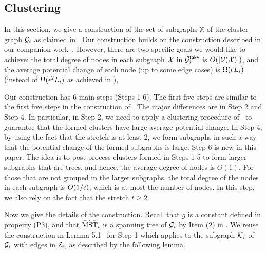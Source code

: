 \subsection{Clustering} \label{subsec:clusteringT2}


In this section, we give a construction of the set of subgraphs $\mathbb{X}$ of the cluster graph $\mathcal{G}_i$ as claimed in . Our construction builds on the construction described in our companion work~\cite{LS21}. However, there are two specific goals we would like to achieve: the total degree of nodes in each subgraph $\mathcal{X}$ in $\mathcal{G}_i^{\mathsf{take}}$  is $O(|\mathcal{V}(\mathcal{X})|)$, and the average potential change of each node (up to some edge cases) is $\Omega(\epsilon L_i)$ (instead of $\Omega(\epsilon^2 L_i)$ as achieved in \cite{LS21}), 


Our construction  has 6 main steps (Steps 1-6). The first five steps are similar to the first five steps in the construction of \cite{LS21}. The major differences are in Step 2 and Step 4. In particular, in Step 2, we need to apply a clustering procedure of~\cite{LS19} to guarantee that the formed clusters have large average potential change. In Step 4, by using the fact that the stretch is at least 2, we form subgraphs in such a way that the potential change of the formed subgraphs is large. Step 6 is new in this paper. The idea is to post-process clusters formed in Steps 1-5 to form larger subgraphs that are trees, and hence, the average degree of nodes is $O(1)$. For those that are not grouped in the larger subgraphs,  the total degree of the nodes in each subgraph  is $O(1/\epsilon)$, which is at most the number of nodes.   In this step, we also rely on the fact that the stretch $t\geq 2$.



Now we give the details of the construction. Recall that $g$ is a constant defined in \hyperlink{P3}{property (P3)}, and that $\widetilde{\mathrm{MST}}_{i}$ is a spanning tree of $\mathcal{G}_i$ by Item (2) in . We reuse the construction in  Lemma 5.1~\cite{LS21} for Step 1 which applies to the subgraph $\mathcal{K}_i$ of $\mathcal{G}_i$ with edges in $\mathcal{E}_i$, as described by the following lemma.

